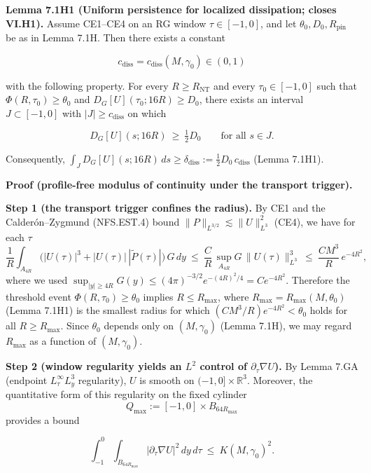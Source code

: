 \documentclass[
  11pt,
]{article}
\begin{document}
\textbf{Lemma 7.1H1 (Uniform persistence for localized dissipation; closes VI.H1).} Assume CE1--CE4 on an RG window \(\tau\in[-1,0]\), and let \(\theta_0,D_0,R_{\mathrm{pin}}\) be as in Lemma 7.1H. Then there exists a constant

\begin{equation}
c_{\mathrm{diss}}=c_{\mathrm{diss}}(M,\gamma_0)\in(0,1)
\tag{7.1H11}\label{eq:7_1H11_cdiss_def}
\end{equation}

with the following property. For every \(R\ge R_{\mathrm{NT}}\) and every \(\tau_0\in[-1,0]\) such that \(\Phi(R,\tau_0)\ge \theta_0\) and \(D_G[U](\tau_0;16R)\ge D_0\), there exists an interval \(J\subset[-1,0]\) with \(|J|\ge c_{\mathrm{diss}}\) on which

\begin{equation}
D_G[U](s;16R)\ \ge\ \tfrac12 D_0\qquad\text{for all }s\in J.
\tag{7.1H12}\label{eq:7_1H12_D_persists}
\end{equation}

Consequently, \(\int_J D_G[U](s;16R)\,ds\ge \delta_{\mathrm{diss}}:=\tfrac12 D_0\,c_{\mathrm{diss}}\) (Lemma 7.1H1).

\textbf{Proof (profile-free modulus of continuity under the transport trigger).}

\textbf{Step 1 (the transport trigger confines the radius).} By CE1 and the Calderón--Zygmund (NFS.EST.4) bound \(\|P\|_{L^{3/2}}\lesssim\|U\|_{L^3}^2\) (CE4), we have for each \(\tau\) \[
\frac1R\int_{A_{4R}}\big(|U(\tau)|^3+|U(\tau)|\,|\widetilde P(\tau)|\big)\,G\,dy
\ \le\ \frac{C}{R}\,\sup_{A_{4R}}G\,\|U(\tau)\|_{L^3}^3
\ \le\ \frac{C M^3}{R}\,e^{-4R^2},
\] where we used \(\sup_{|y|\ge 4R}G(y)\le (4\pi)^{-3/2}e^{-(4R)^2/4}=C e^{-4R^2}\). Therefore the threshold event \(\Phi(R,\tau_0)\ge\theta_0\) implies \(R\le R_{\max}\), where \(R_{\max}=R_{\max}(M,\theta_0)\) (Lemma 7.1H1) is the smallest radius for which \((C M^3/R)e^{-4R^2}<\theta_0\) holds for all \(R\ge R_{\max}\). Since \(\theta_0\) depends only on \((M,\gamma_0)\) (Lemma 7.1H), we may regard \(R_{\max}\) as a function of \((M,\gamma_0)\).

\textbf{Step 2 (window regularity yields an \(L^2\) control of \(\partial_\tau\nabla U\)).} By Lemma 7.GA (endpoint \(L^\infty_\tau L^3_y\) regularity), \(U\) is smooth on \((-1,0]\times\mathbb R^3\). Moreover, the quantitative form of this regularity on the fixed cylinder \[
Q_{\max}:=[-1,0]\times B_{64R_{\max}}
\] provides a bound

\begin{equation}
\int_{-1}^{0}\!\!\int_{B_{64R_{\max}}}\!|\partial_\tau\nabla U|^2\,dy\,d\tau\ \le\ K(M,\gamma_0)^2.
\tag{7.1H13}\label{eq:7_1H13_dt_grad_bound}
\end{equation}
\end{document}
